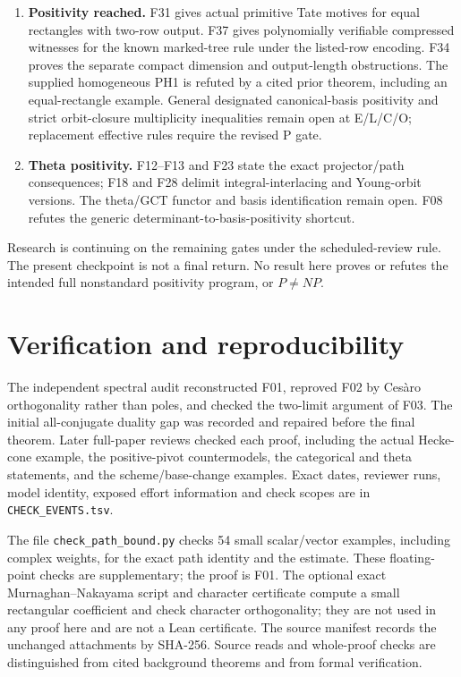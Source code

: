 \documentclass[11pt,a4paper]{article}
\theoremstyle{named}\newtheorem{finding}{Finding}[section]
\theoremstyle{definition}\newtheorem{definition}[finding]{Definition}
\theoremstyle{remark}\newtheorem{remark}[finding]{Remark}
\begin{document}
\begin{enumerate}
\item \textbf{Positivity reached.} F31 gives actual primitive Tate motives for equal rectangles with two-row output. F37 gives polynomially verifiable compressed witnesses for the known marked-tree rule under the listed-row encoding. F34 proves the separate compact dimension and output-length obstructions. The supplied homogeneous PH1 is refuted by a cited prior theorem, including an equal-rectangle example. General designated canonical-basis positivity and strict orbit-closure multiplicity inequalities remain open at E/L/C/O; replacement effective rules require the revised P gate.
\item \textbf{Theta positivity.} F12--F13 and F23 state the exact projector/path consequences; F18 and F28 delimit integral-interlacing and Young-orbit versions. The theta/GCT functor and basis identification remain open. F08 refutes the generic determinant-to-basis-positivity shortcut.
\end{enumerate}

Research is continuing on the remaining gates under the scheduled-review rule. The present checkpoint is not a final return. No result here proves or refutes the intended full nonstandard positivity program, or $P\ne NP$.

\appendix
\section{Verification and reproducibility}
The independent spectral audit reconstructed F01, reproved F02 by Ces\`aro orthogonality rather than poles, and checked the two-limit argument of F03. The initial all-conjugate duality gap was recorded and repaired before the final theorem. Later full-paper reviews checked each proof, including the actual Hecke-cone example, the positive-pivot countermodels, the categorical and theta statements, and the scheme/base-change examples. Exact dates, reviewer runs, model identity, exposed effort information and check scopes are in \texttt{CHECK\_EVENTS.tsv}.

The file \texttt{check\_path\_bound.py} checks 54 small scalar/vector examples, including complex weights, for the exact path identity and the estimate. These floating-point checks are supplementary; the proof is F01. The optional exact Murnaghan--Nakayama script and character certificate compute a small rectangular coefficient and check character orthogonality; they are not used in any proof here and are not a Lean certificate. The source manifest records the unchanged attachments by SHA-256. Source reads and whole-proof checks are distinguished from cited background theorems and from formal verification.
\end{document}

